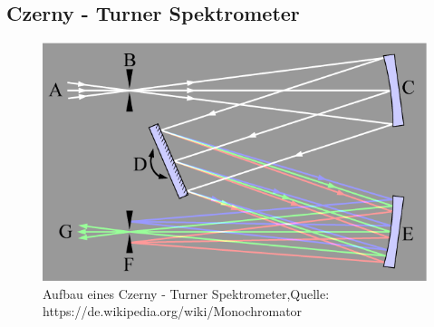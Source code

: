     \subsection{Czerny - Turner Spektrometer}
        \begin{myframe}{\subsecname}
            \begin{figure}
                \includegraphics[width=0.6\linewidth]{img/czernyTurnerSpectrometer_Wikipedia.png}
                \caption{Aufbau eines Czerny - Turner Spektrometer,\newline Quelle: https://de.wikipedia.org/wiki/Monochromator}
                \label{czernyTurnerSpektrometer}
            \end{figure}
        \end{myframe}
